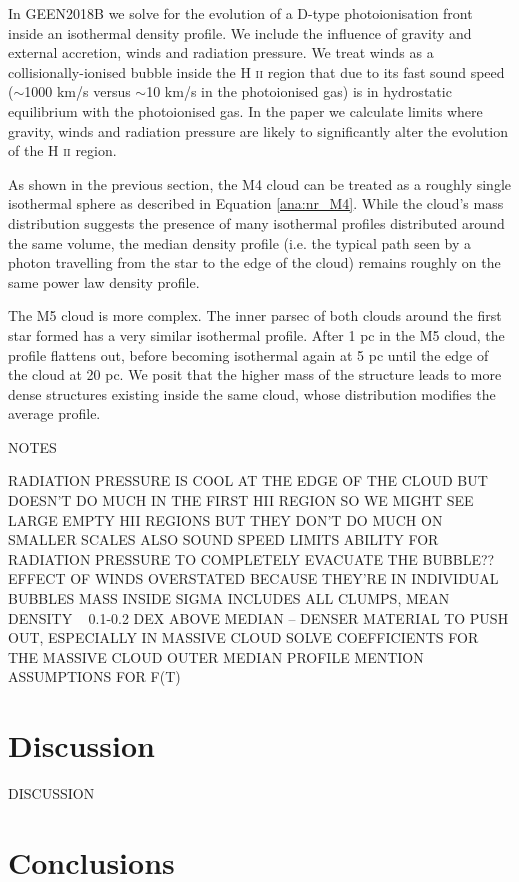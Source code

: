 \documentclass[a4paper,fleqn,usenatbib]{mnras}
\newcommand{\HII}{H \textsc{ii}\xspace}
\begin{document}
In GEEN2018B we solve for the evolution of a D-type photoionisation front inside an isothermal density profile. We include the influence of gravity and external accretion, winds and radiation pressure. We treat winds as a collisionally-ionised bubble inside the \HII region that due to its fast sound speed ($\sim$1000 km/s versus $\sim$10 km/s in the photoionised gas) is in hydrostatic equilibrium with the photoionised gas. In the paper we calculate limits where gravity, winds and radiation pressure are likely to significantly alter the evolution of the \HII region.

As shown in the previous section, the M4 cloud can be treated as a roughly single isothermal sphere as described in Equation \ref{ana:nr_M4}. While the cloud's mass distribution suggests the presence of many isothermal profiles distributed around the same volume, the median density profile (i.e. the typical path seen by a photon travelling from the star to the edge of the cloud) remains roughly on the same power law density profile.

The M5 cloud is more complex. The inner parsec of both clouds around the first star formed has a very similar isothermal profile. After 1 pc in the M5 cloud, the profile flattens out, before becoming isothermal again at 5 pc until the edge of the cloud at 20 pc. We posit that the higher mass of the structure leads to more dense structures existing inside the same cloud, whose distribution modifies the average profile.

NOTES

RADIATION PRESSURE IS COOL AT THE EDGE OF THE CLOUD BUT DOESN'T DO MUCH IN THE FIRST HII REGION
SO WE MIGHT SEE LARGE EMPTY HII REGIONS BUT THEY DON'T DO MUCH ON SMALLER SCALES
ALSO SOUND SPEED LIMITS ABILITY FOR RADIATION PRESSURE TO COMPLETELY EVACUATE THE BUBBLE??
EFFECT OF WINDS OVERSTATED BECAUSE THEY'RE IN INDIVIDUAL BUBBLES
MASS INSIDE SIGMA INCLUDES ALL CLUMPS, MEAN DENSITY ~ 0.1-0.2 DEX ABOVE MEDIAN -- DENSER MATERIAL TO PUSH OUT, ESPECIALLY IN MASSIVE CLOUD
SOLVE COEFFICIENTS FOR THE MASSIVE CLOUD OUTER MEDIAN PROFILE
MENTION ASSUMPTIONS FOR F(T)

\section{Discussion}

DISCUSSION

\section{Conclusions}
\end{document}

